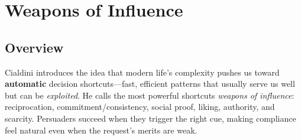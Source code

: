 \section{Weapons of Influence}

\subsection*{Overview}
Cialdini introduces the idea that modern life’s complexity pushes us toward \textbf{automatic} decision shortcuts—fast, efficient patterns that usually serve us well but can be \emph{exploited}. He calls the most powerful shortcuts \emph{weapons of influence}: reciprocation, commitment/consistency, social proof, liking, authority, and scarcity. Persuaders succeed when they trigger the right cue, making compliance feel natural even when the request’s merits are weak.


